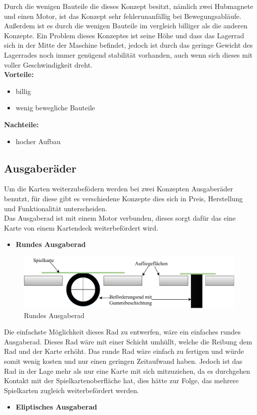 Durch die wenigen Bauteile die dieses Konzept besitzt, nämlich zwei Hubmagnete und einen Motor, ist das Konzept sehr fehlerunanfällig bei Bewegungsabläufe. Außerdem ist es
durch die wenigen Bauteile im vergleich billiger als die anderen Konzepte. Ein Problem dieses Konzeptes ist seine Höhe und dass das Lagerrad sich in der Mitte der Maschine befindet,
jedoch ist durch das geringe Gewicht des Lagerrades noch immer genügend stabilität vorhanden, auch wenn sich dieses mit voller Geschwindigkeit dreht. \\

\textbf{Vorteile:}
\begin{itemize}
    \item billig
    \item wenig bewegliche Bauteile
\end{itemize}
\textbf{Nachteile:}
\begin{itemize}
    \item hocher Aufbau
\end{itemize}

 \subsection{Ausgaberäder}
Um die Karten weiterzubefödern werden bei zwei Konzepten Ausgaberäder benutzt, für diese gibt es verschiedene Konzepte dies sich in Preis, Herstellung und Funktionalität unterscheiden.\\
Das Ausgaberad ist mit einem Motor verbunden, dieses sorgt dafür das eine Karte von einem Kartendeck weiterbefördert wird.
\begin{itemize}
    \item \textbf{Rundes Ausgaberad}
\end{itemize}

\begin{figure}[H]
    \centering
    \includegraphics[scale=0.5,page=1]{fig/mech/RundesAusgaberad-Page-1}
    \caption{Rundes Ausgaberad}
\end{figure}

    Die einfachste Möglichkeit dieses Rad zu entwerfen, wäre ein einfaches rundes Ausgaberad. Dieses Rad wäre mit einer Schicht umhüllt, welche die Reibung
        dem Rad und der Karte erhöht. Das runde Rad wäre einfach zu fertigen und würde somit wenig kosten und nur einen geringen Zeitaufwand haben. Jedoch
        ist das Rad in der Lage mehr als nur eine Karte mit sich mitzuziehen, da es durchgehen Kontakt mit der Spielkartenoberfläche hat, dies hätte zur
        Folge, das mehrere Spielkarten zugleich weiterbefördert werden.
\begin{itemize}
    \item \textbf{Eliptisches Ausgaberad}
\end{itemize}

